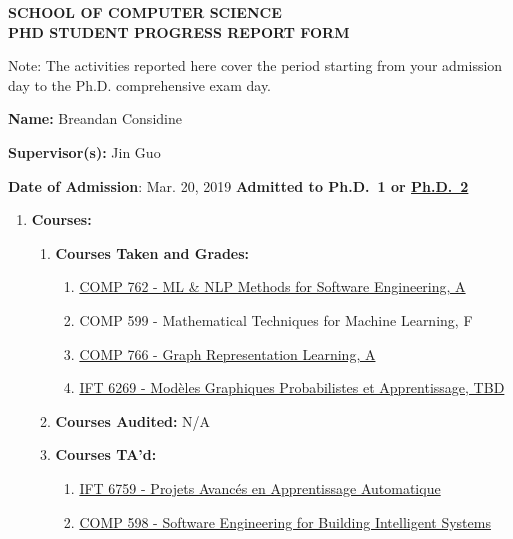 \documentclass[11pt]{article}
\begin{document}
    \begin{center}
        \large {\bf SCHOOL OF COMPUTER SCIENCE \\ PHD STUDENT PROGRESS REPORT FORM}
    \end{center}

    Note: The activities reported here cover the period starting
    from your admission day to the Ph.D. comprehensive exam day.
    \medskip

    \textbf{Name:} Breandan Considine

    \textbf{Supervisor(s):} Jin Guo

    \textbf{Date of Admission}: Mar. 20, 2019
    \hspace{45mm}
    \textbf{Admitted to Ph.D.\ 1 or \underline{Ph.D.\ 2}}

    \begin{enumerate}
        \item \textbf{Courses:}
        \begin{enumerate}
            \item \textbf{Courses Taken and Grades:}

            \begin{enumerate}
                \item \href{https://www.cs.mcgill.ca/~cs762/}{COMP 762 - ML \& NLP Methods for Software Engineering, A}
                \item COMP 599 - Mathematical Techniques for Machine Learning, F
                \item \href{https://cs.mcgill.ca/~wlh/comp766/}{COMP 766 - Graph Representation Learning, A}
                \item \href{http://www.iro.umontreal.ca/~slacoste/teaching/ift6269/A20/}{IFT 6269 - Mod\`eles Graphiques Probabilistes et Apprentissage, TBD}
            \end{enumerate}

            \item \textbf{Courses Audited:} N/A

            \item \textbf{Courses TA'd:}

            \begin{enumerate}
                \item \href{https://admission.umontreal.ca/cours-et-horaires/cours/IFT-6759/}{IFT 6759 - Projets Avanc\'es en Apprentissage Automatique}
                \item \href{https://github.com/jin-guo/COMP598_Fall2020}{COMP 598 - Software Engineering for Building Intelligent Systems}
            \end{enumerate}


\end{enumerate}
\end{enumerate}
\end{document}
